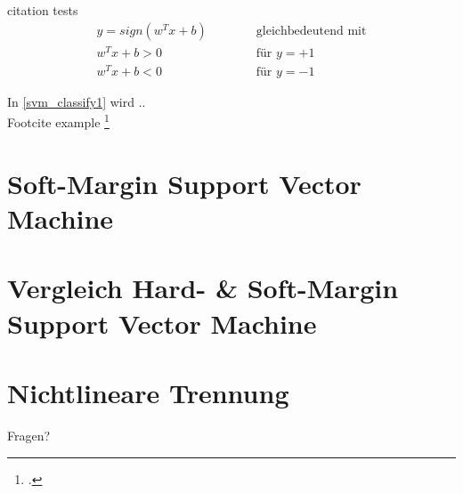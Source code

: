\documentclass[ngerman]{beamer}
\begin{document}
\begin{frame}{citation tests}
	\begin{subequations} \label{svm_classify1}
		\begin{alignat}{2}
			y = sign(w^{T} x + b)  & \qquad & \text{ gleichbedeutend mit} \\
			w^{T} x + b > 0 & & \text{ für } y = +1\\
			w^{T} x + b < 0 & & \text{ für } y = -1
		\end{alignat}
	\end{subequations}

	In \cref{svm_classify1} wird .. \\
	
	Footcite example \footcite{platt_sequential_1998} \\
	
	\textcite{burges_tutorial_1998}
\end{frame}


\section{Soft-Margin Support Vector Machine}

\section{Vergleich Hard- \& Soft-Margin Support Vector Machine}

\section{Nichtlineare Trennung}



\begin{frame}[standout]
	Fragen?
\end{frame}

\begin{frame}
	\printbibliography
\end{frame}
\end{document}
